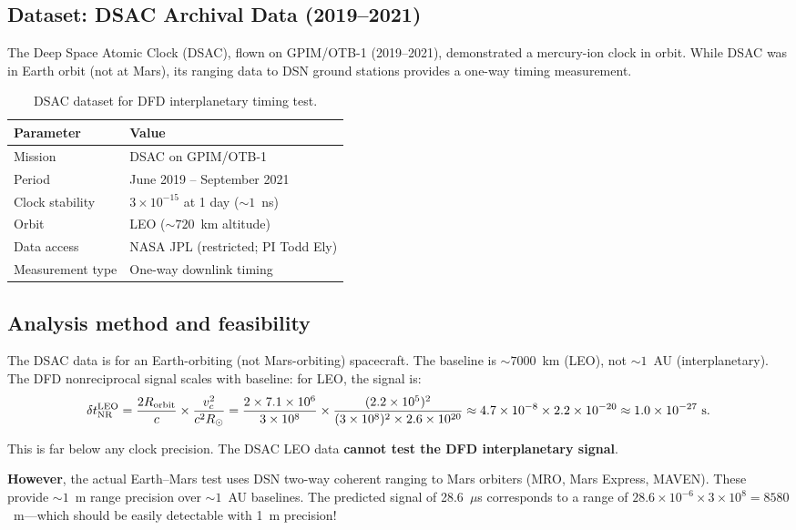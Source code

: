 \documentclass[11pt]{article}
\newcommand{\ee}[1]{\times 10^{#1}}
\begin{document}
\subsection{Dataset: DSAC Archival Data (2019--2021)}

The Deep Space Atomic Clock (DSAC), flown on GPIM/OTB-1 (2019--2021),
demonstrated a mercury-ion clock in orbit. While DSAC was in Earth
orbit (not at Mars), its ranging data to DSN ground stations provides
a one-way timing measurement.

\begin{table}[H]
\centering
\caption{DSAC dataset for DFD interplanetary timing test.}
\begin{tabular}{ll}
\toprule
\textbf{Parameter} & \textbf{Value} \\
\midrule
Mission & DSAC on GPIM/OTB-1 \\
Period & June 2019 -- September 2021 \\
Clock stability & $3\ee{-15}$ at 1 day ($\sim 1$~ns) \\
Orbit & LEO ($\sim 720$~km altitude) \\
Data access & NASA JPL (restricted; PI Todd Ely) \\
Measurement type & One-way downlink timing \\
\bottomrule
\end{tabular}
\end{table}

\subsection{Analysis method and feasibility}

The DSAC data is for an Earth-orbiting (not Mars-orbiting) spacecraft.
The baseline is $\sim 7000$~km (LEO), not $\sim 1$~AU (interplanetary).
The DFD nonreciprocal signal scales with baseline: for LEO, the signal
is:
\begin{equation}
\delta t_{\rm NR}^{\rm LEO} = \frac{2R_{\rm orbit}}{c}\times
\frac{v_c^2}{c^2 R_\odot} = \frac{2\times 7.1\ee{6}}{3\ee{8}}
\times \frac{(2.2\ee{5})^2}{(3\ee{8})^2\times 2.6\ee{20}}
\approx 4.7\ee{-8}\times 2.2\ee{-20} \approx 1.0\ee{-27}~\text{s}.
\end{equation}

This is far below any clock precision. The DSAC LEO data
\textbf{cannot test the DFD interplanetary signal}.

\textbf{However}, the actual Earth--Mars test uses DSN two-way coherent
ranging to Mars orbiters (MRO, Mars Express, MAVEN). These provide
$\sim 1$~m range precision over $\sim 1$~AU baselines. The predicted
signal of 28.6~$\mu$s corresponds to a range of $28.6\ee{-6}\times
3\ee{8} = 8580$~m---which should be easily detectable with 1~m precision!
\end{document}
